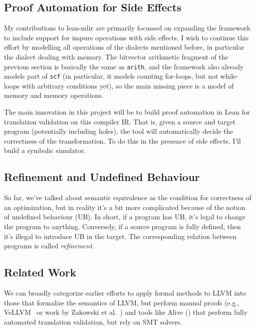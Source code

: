 \documentclass[a4paper]{scrartcl}
\begin{document}
\subsection{Proof Automation for Side
Effects}\label{proof-automation-for-side-effects}

My contributions to lean-mlir are primarily focussed on expanding the framework to 
include support for impure operations with side effects. 
I wish to continue this effort by modelling all operations of the
dialects mentioned before, in particular the dialect dealing with memory.
The bitvector arithmetic fragment of the previous section is basically the same as \texttt{arith}, and the
framework also already models part of \texttt{scf} (in particular, it
models counting for-loops, but not while-loops with arbitrary conditions
yet), so the main missing piece is a model of memory and memory
operations.

The main innovation in this project will be to build proof automation in
Lean for translation validation on this compiler IR. That is, given a
source and target program (potentially including holes), the tool will
automatically decide the correctness of the transformation. To do this
in the presence of side effects, I'll build a symbolic simulator.

\subsection{Refinement and Undefined
Behaviour}\label{refinement-and-undefined-behaviour}

So far, we've talked about semantic equivalence as the condition for
correctness of an optimization, but in reality it's a bit more
complicated because of the notion of undefined behaviour (UB). In short,
if a program has UB, it's legal to change the program to anything.
Conversely, if a source program is fully defined, then it's illegal to
introduce UB in the target. The corresponding relation between programs
is called \emph{refinement}. 

\subsection{Related Work}

We can broadly categorize earlier efforts to apply formal methods to
LLVM into those that formalize the semantics of LLVM, but perform manual
proofs (e.g., VeLLVM~\cite{zhaoFormalVerificationSSABased, zhaoFormalizingLLVMIntermediate2012} 
or work by Zakowski et al.~\cite{zakowskiModularCompositionalExecutable2021}) and tools
like Alive (\cite{lopesAlive2BoundedTranslation2021}) that perform
fully automated translation validation, but rely on SMT solvers.
\end{document}
